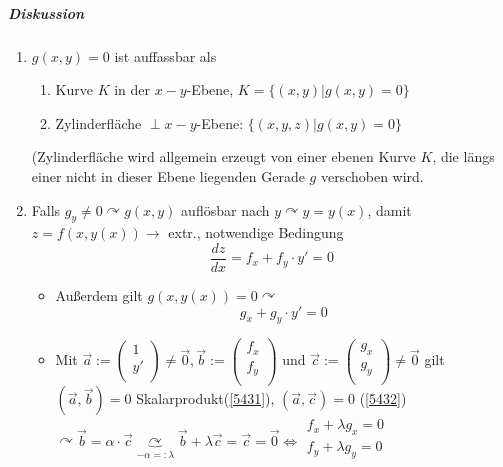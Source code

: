 \documentclass[a4paper]{scrartcl}
\begin{document}
\subparagraph{Diskussion}
\begin{enumerate}
\item $g(x,y) = 0$ ist auffassbar als  
\begin{enumerate}
\item Kurve $K$ in der $x-y$-Ebene, $K = \{ (x,y) | g(x,y)=0 \}$
\item Zylinderfläche $\perp x-y$-Ebene: $\{(x,y,z) | g(x,y) =0 \}$
\end{enumerate}
(Zylinderfläche wird allgemein erzeugt von einer ebenen Kurve $K$, die längs einer nicht in dieser Ebene liegenden Gerade $g$ verschoben wird.
\item Falls $g_y \neq 0 \curvearrowright g(x,y)$ auflösbar nach $y \curvearrowright y = y(x)$, damit $z=f(x,y(x)) \rightarrow$ extr., notwendige Bedingung
\begin{equation}\label{5431}
\frac{dz}{dx} = f_x + f_y \cdot y' = 0
\end{equation}
\begin{itemize}
\item Außerdem gilt $g(x,y(x))=0 \curvearrowright$\begin{equation}\label{5432} g_x + g_y \cdot y' = 0\end{equation}
\item Mit $\vec{a} := \begin{pmatrix} 1 \\ y' \\ \end{pmatrix} \neq \vec{0}, \vec{b} := \begin{pmatrix} f_x \\ f_y \\ \end{pmatrix}$ und $\vec{c} := \begin{pmatrix} g_x \\ g_y \\ \end{pmatrix} \neq \vec{0}$ gilt $(\vec{a},\vec{b}) = 0$ Skalarprodukt(\ref{5431}), $(\vec{a},\vec{c}) = 0$ (\ref{5432})\\
$\curvearrowright \vec{b} = \alpha \cdot \vec{c} \underbrace{\curvearrowright}_{-\alpha =: \lambda} \vec{b} + \lambda \vec{c} = \vec{c} = \vec{0} \Leftrightarrow \begin{array}{c} f_x + \lambda g_x = 0 \\ f_y + \lambda g_y = 0\\ \end{array}$
\end{itemize}

\end{enumerate}
\end{document}
